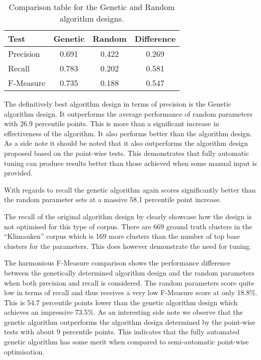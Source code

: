\begin{table}[H]
\begin{center}
\begin{tabular}{|l|ccc|}
\hline
Test & 				Genetic 	& 	Random 	& Difference\\ 
\hline
Precision 		&	0.691 		& 	0.422		&  0.269\\ 
Recall 			&   0.783 		&   0.202  		&  0.581\\ 
F-Measure		& 	0.735		&	0.188 		&  0.547\\
\hline
\end{tabular}
\end{center}
\caption{Comparison table for the Genetic and Random algorithm designs.}
\label{tab:geneticrandomcomparison}
\end{table}

The definitively best algorithm design in terms of precision is the Genetic algorithm design. It outperforms the average performance of random parameters with 26.9 percentile points. This is more than a significant increase in effectiveness of the algorithm. It also performs better than the \citeauthor{Oren1998} algorithm design. As a side note it should be noted that it also outperforms the algorithm design proposed based on the point-wise tests. This demonstrates that fully automatic tuning can produce results better than those achieved when some manual input is provided.

With regards to recall the genetic algorithm again scores significantly better than the random parameter sets at a massive 58.1 percentile point increase. 


The recall of the original algorithm design by \citeauthor{Oren1998} clearly showcase how the design is not optimised for this type of corpus. There are 669 ground truth clusters in the ``Klimauken'' corpus which is 169 more clusters than the number of top base clusters for the \citeauthor{Oren1998} parameters. This does however demonstrate the need for tuning.

The harmonious F-Measure comparison shows the performance difference between the genetically determined algorithm design and the random parameters when both precision and recall is considered. The random parameters score quite low in terms of recall and thus receives a very low F-Measure score at only 18.8\%. This is 54.7 percentile points lower than the genetic algorithm design which achieves an impressive 73.5\%. As an interesting side note we observe that the genetic algorithm outperforms the algorithm design determined by the point-wise tests with about 9 percentile points. This indicates that the fully automated genetic algorithm has some merit when compared to semi-automatic point-wise optimisation.

